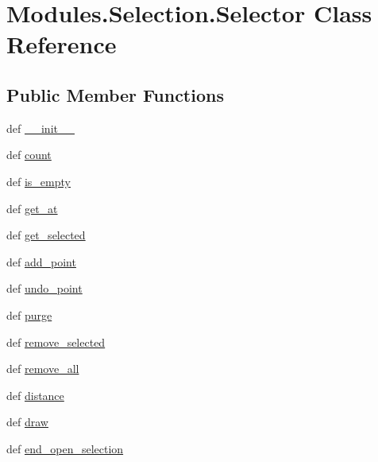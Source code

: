 \hypertarget{classModules_1_1Selection_1_1Selector}{\section{Modules.\-Selection.\-Selector Class Reference}
\label{classModules_1_1Selection_1_1Selector}
}
\subsection*{Public Member Functions}
\begin{DoxyCompactItemize}
\item 
def \hyperlink{classModules_1_1Selection_1_1Selector_a1b98af1f25e688e011b503940f8d9d38}{\-\_\-\-\_\-init\-\_\-\-\_\-}
\item 
def \hyperlink{classModules_1_1Selection_1_1Selector_a57f1e6c1d88b595d11a9a4a9b81f6c2b}{count}
\item 
def \hyperlink{classModules_1_1Selection_1_1Selector_a3062c36cd70a61b57dba62b2aa7deae3}{is\-\_\-empty}
\item 
def \hyperlink{classModules_1_1Selection_1_1Selector_a76c0b484dd4960f572ac097cc6a9018f}{get\-\_\-at}
\item 
def \hyperlink{classModules_1_1Selection_1_1Selector_a8cb517933be366669b37554ae22ea022}{get\-\_\-selected}
\item 
def \hyperlink{classModules_1_1Selection_1_1Selector_accfcafb39c5fa5fcf1ff5c1da1d43461}{add\-\_\-point}
\item 
def \hyperlink{classModules_1_1Selection_1_1Selector_abeceee26df62e70817d924b6323bebfe}{undo\-\_\-point}
\item 
def \hyperlink{classModules_1_1Selection_1_1Selector_a286ace8f8487fdad80fb46eb6b645086}{purge}
\item 
def \hyperlink{classModules_1_1Selection_1_1Selector_af0c515145afa4fff51d7b061d42898b0}{remove\-\_\-selected}
\item 
def \hyperlink{classModules_1_1Selection_1_1Selector_a22b452174c86921942a6ed010b4b6748}{remove\-\_\-all}
\item 
def \hyperlink{classModules_1_1Selection_1_1Selector_ac6821be9818506f78ebc0263ce0cb8fa}{distance}
\item 
def \hyperlink{classModules_1_1Selection_1_1Selector_a5bf9ee3a076b7b6153dc4f2a84665be8}{draw}
\item 
def \hyperlink{classModules_1_1Selection_1_1Selector_a75dd39a943e05f1fce458b3feb56d834}{end\-\_\-open\-\_\-selection}

\end{DoxyCompactItemize}
